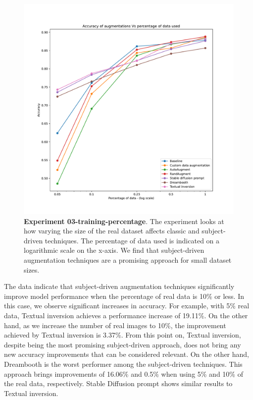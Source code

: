 \begin{figure}
    \centering
    \includegraphics[width=1\textwidth]{Pictures/experiment_003.pdf}
    \caption{\textbf{Experiment 03-training-percentage}. The experiment looks at how varying the size of the real dataset affects classic and subject-driven techniques. The percentage of data used is indicated on a logarithmic scale on the x-axis. We find that subject-driven augmentation techniques are a promising approach for small dataset sizes.}
    \label{fig:exp3}
\end{figure}

The data indicate that subject-driven augmentation techniques significantly improve model performance when the percentage of real data is 10\% or less. In this case, we observe significant increases in accuracy. For example, with 5\% real data, Textual inversion achieves a performance increase of 19.11\%. On the other hand, as we increase the number of real images to 10\%, the improvement achieved by Textual inversion is 3.37\%. From this point on, Textual inversion, despite being the most promising subject-driven approach, does not bring any new accuracy improvements that can be considered relevant. On the other hand, Dreambooth is the worst performer among the subject-driven techniques. This approach brings improvements of 16.06\% and 0.5\% when using 5\% and 10\% of the real data, respectively. Stable Diffusion prompt shows similar results to Textual inversion.

